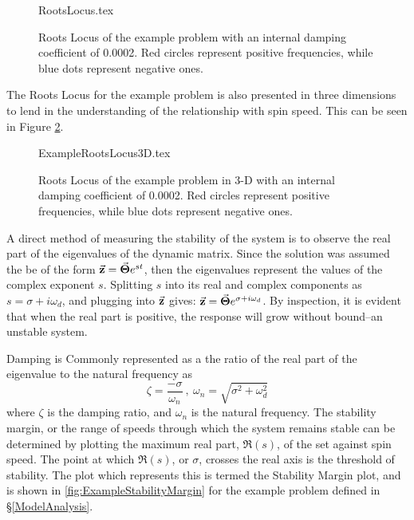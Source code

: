 \begin{figure}
	\def\width{.6*\linewidth}
	\def\height{.3*\linewidth}
	\def\sep{3em}
	\centering
	{RootsLocus.tex}
	\caption{Roots Locus of the example problem with an internal damping coefficient of 0.0002. Red circles represent positive frequencies, while blue dots represent negative ones.}
	\label{fig:ExampleRootsLocus}
\end{figure}
The Roots Locus for the example problem is also presented in three dimensions to lend in the understanding of the relationship with spin speed. This can be seen in Figure \ref{fig:ExampleRootsLocus3D}.
\begin{figure}
	\def\width{.6*\linewidth}
	\def\height{.3*\linewidth}
	\def\sep{3em}
	\centering
	{ExampleRootsLocus3D.tex}
	\caption{Roots Locus of the example problem in 3-D with an internal damping coefficient of 0.0002. Red circles represent positive frequencies, while blue dots represent negative ones.}
	\label{fig:ExampleRootsLocus3D}
\end{figure}
A direct method of measuring the stability of the system is to observe the real part of the eigenvalues of the dynamic matrix. Since the solution was assumed the be of the form $ \vec{\mathbf{z}}=\vec{\mathbf{\Theta}}e^{st} $, then the eigenvalues represent the values of the complex exponent $ s $. Splitting $ s $ into its real and complex components as $ s=\sigma+i\omega_{d} $, and plugging into $ \vec{\mathbf{z}} $ gives: $ \vec{\mathbf{z}}=\vec{\mathbf{\Theta}}e^{\sigma+i\omega_{d}} $. By inspection, it is evident that when the real part is positive, the response will grow without bound--an unstable system.\par
Damping is Commonly represented as a the ratio of the real part of the eigenvalue to the natural frequency as
\begin{equation}
\zeta=\frac{-\sigma}{\omega_n}\ ,\ \omega_n=\sqrt{\sigma^2+\omega_{d}^2}
\end{equation}
where $ \zeta $ is the damping ratio, and  $ \omega_n $ is the natural frequency. The stability margin, or the range of speeds through which the system remains stable can be determined by plotting the maximum real part, $ \Re(s) $, of the set against spin speed. The point at which $ \Re(s) $, or $ \sigma $, crosses the real axis is the threshold of stability. The plot which represents this is termed the Stability Margin plot, and is shown in \ref{fig:ExampleStabilityMargin} for the example problem defined in \S\ref{ModelAnalysis}.\par
